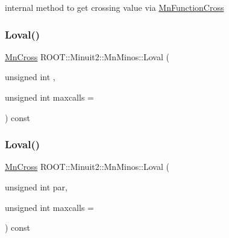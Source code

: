 internal method to get crossing value via \mbox{\hyperlink{classROOT_1_1Minuit2_1_1MnFunctionCross}{Mn\+Function\+Cross}} 

\mbox{\label{classROOT_1_1Minuit2_1_1MnMinos_a708381f90e4bd9118dec60726a1bdf73}} 
\subsubsection{\texorpdfstring{Loval()}{Loval()}\hspace{0.1cm}{\footnotesize\ttfamily [1/2]}}
{\footnotesize\ttfamily \mbox{\hyperlink{classROOT_1_1Minuit2_1_1MnCross}{Mn\+Cross}} R\+O\+O\+T\+::\+Minuit2\+::\+Mn\+Minos\+::\+Loval (\begin{DoxyParamCaption}\item[{unsigned int}]{,  }\item[{unsigned int}]{maxcalls = {} }\end{DoxyParamCaption}) const}

\mbox{\label{classROOT_1_1Minuit2_1_1MnMinos_a708381f90e4bd9118dec60726a1bdf73}} 
\subsubsection{\texorpdfstring{Loval()}{Loval()}\hspace{0.1cm}{\footnotesize\ttfamily [2/2]}}
{\footnotesize\ttfamily \mbox{\hyperlink{classROOT_1_1Minuit2_1_1MnCross}{Mn\+Cross}} R\+O\+O\+T\+::\+Minuit2\+::\+Mn\+Minos\+::\+Loval (\begin{DoxyParamCaption}\item[{unsigned int}]{par,  }\item[{unsigned int}]{maxcalls = {} }\end{DoxyParamCaption}) const}

